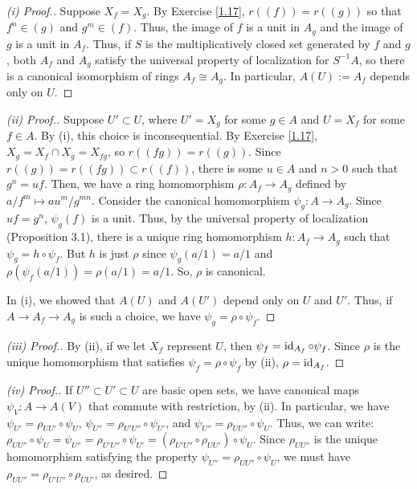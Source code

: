 \begin{proof}[(i) Proof.]
Suppose $X_f = X_g$. By Exercise \ref{1.17}, $r((f)) = r((g))$ so that $f^n \in (g)$ and $g^m \in (f)$. Thus, the image of $f$ is a unit in $A_g$ and
the image of $g$ is a unit in $A_f$. Thus, if $S$ is the multiplicatively closed set generated by $f$ and $g$, both $A_f$ and $A_g$ satisfy the universal
property of localization for $S^{-1}A$, so there is a canonical isomorphism of rings $A_f \cong A_g$. In particular, $A(U) := A_f$ depends only on $U$.
\end{proof}

\begin{proof}[(ii) Proof.]
Suppose $U' \subset U$, where $U' = X_g$ for some $g \in A$ and $U = X_f$ for some $f \in A$. By (i), this choice is inconsequential. By Exercise \ref{1.17},
$X_g = X_f \cap X_g = X_{fg}$, so $r((fg)) = r((g))$. Since $r((g)) = r((fg)) \subset r((f))$, there is some $u\in A$ and $n > 0$ such
that $g^n = uf$. Then, we have a ring homomorphism $\rho : A_f \to A_g$ defined by $a/f^m \mapsto au^m/g^{mn}$. Consider the canonical homomorphism $\psi_g : A \to A_g$.
Since $uf = g^n$, $\psi_g(f)$ is a unit. Thus, by the universal property of localization (Proposition 3.1), there is a unique ring homomorphism $h : A_f \to A_g$ such that 
$\psi_g = h \circ \psi_f$. But $h$ is just $\rho$ since $\psi_g(a/1) = a/1$ and $\rho(\psi_f(a/1)) = \rho(a/1) = a/1$. So, $\rho$ is canonical.

In (i), we showed that $A(U)$ and $A(U')$ depend only on $U$ and $U'$. Thus, if $A \to A_f \to A_g$ is such a choice, we have $\psi_g = \rho\circ\psi_f$.
\end{proof}

\begin{proof}[(iii) Proof.]
By (ii), if we let $X_f$ represent $U$, then $\psi_f = \operatorname{id}_{A_f}\circ\psi_f$. Since $\rho$ is the unique homomorphism that satisfies $\psi_f = \rho\circ\psi_f$ by (ii), $\rho = \operatorname{id}_{A_f}$.
\end{proof}

\begin{proof}[(iv) Proof.]
If $U'' \subset U' \subset U$ are basic open sets, we have canonical maps $\psi_V : A \to A(V)$ that commute with restriction, by (ii). In particular, we have $\psi_{U'} = \rho_{UU'}\circ\psi_{U}$,
$\psi_{U''} = \rho_{U'U''}\circ\psi_{U'}$, and $\psi_{U''} = \rho_{UU''}\circ\psi_{U}$. Thus, we can write: $\rho_{UU''} \circ \psi_{U} = \psi_{U''} = \rho_{U'U''}\circ\psi_{U'} = (\rho_{U'U''}\circ\rho_{UU'})\circ\psi_{U}$.
Since $\rho_{UU''}$ is the unique homomorphism satisfying the property $\psi_{U''} = \rho_{UU''} \circ \psi_{U}$, we must have $\rho_{UU''} =  \rho_{U'U''}\circ\rho_{UU'}$,
as desired.
\end{proof}

